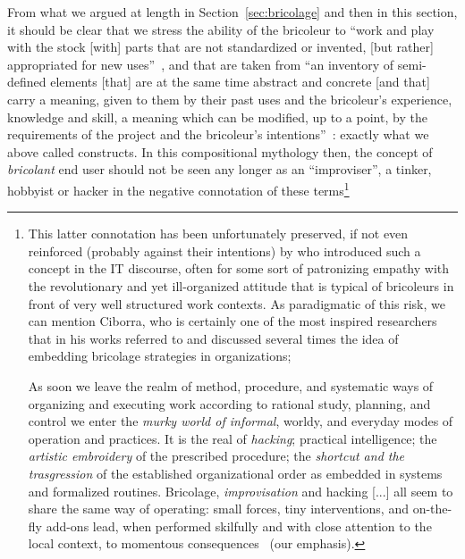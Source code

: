 \documentclass{article}
\let\origquotation\quotation
\let\endorigquotation\endquotation
\renewenvironment{quotation}{\vspace{-0.5\parskip}
  \origquotation
  \footnotesize
}{\endorigquotation}
\begin{document}
From what we argued at length in Section~\ref{sec:bricolage} and then in this section, it should be clear that we stress the ability of the bricoleur to ``work and play with the stock [with] parts that are not standardized or invented, [but rather] appropriated for new uses''~\citep[pp. 161-162]{weinstein_george_1991}, and that are taken from ``an inventory of semi-defined elements [that] are at the same time abstract and concrete [and that] carry a meaning, given to them by their past uses and the bricoleur's experience, knowledge and skill, a meaning which can be modified, up to a point, by the requirements of the project and the bricoleur's intentions''~\citep{louridas_design_1999}: exactly what we above called constructs. In this compositional mythology then, the concept of \emph{bricolant} end user should not be seen any longer as an ``improviser'', a tinker, hobbyist or hacker in the negative connotation of these terms\footnote{ This latter connotation has been unfortunately preserved, if not even reinforced (probably against their intentions) by who introduced such a concept in the IT discourse, often for some sort of patronizing empathy with the revolutionary and yet ill-organized attitude that is typical of bricoleurs in front of very well structured work contexts. As paradigmatic of this risk, we can mention Ciborra, who is certainly one of the most inspired researchers that in his works referred to and discussed several times the idea of embedding bricolage strategies in organizations;
\begin{quotation}
As soon we leave the realm of method, procedure, and systematic ways of organizing and executing work according to rational study, planning, and control we enter the \emph{murky world of informal}, worldy, and everyday modes of operation and practices. It is the real of \emph{hacking}; practical intelligence; the \emph{artistic embroidery} of the prescribed procedure; the \emph{shortcut and the trasgression }of the established organizational order as embedded in systems and formalized routines. Bricolage, \emph{improvisation} and hacking [...] all seem to share the same way of operating: small forces, tiny interventions, and on-the-fly add-ons lead, when performed skilfully and with close attention to the local context, to momentous consequences~\citep[p. 47-48]{ciborra_labyrinths_2002} (our emphasis).
\end{quotation}
}
\end{document}
